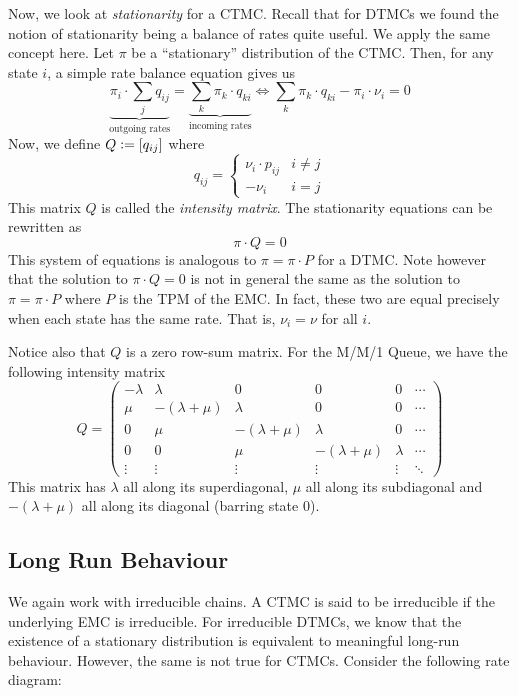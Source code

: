 \documentclass[12pt]{article}
\theoremstyle{definition}
\begin{document}
Now, we look at \emph{stationarity} for a CTMC. Recall that for DTMCs we found the notion of stationarity being a balance of rates quite useful. We apply the same concept here. Let $\pi$ be a ``stationary'' distribution of the CTMC. Then, for any state $i$, a simple rate balance equation gives us
\[
    \underbrace{ \pi_i \cdot \sum_{j} q_{ij} }_{\text{outgoing rates}} = \underbrace{\sum_k \pi_k \cdot q_{ki}}_{\text{incoming rates}} \iff \sum_k \pi_k \cdot q_{ki} - \pi_i \cdot \nu_i = 0
\]
Now, we define $Q \vcentcolon= [q_{ij}]$ where
\[
    q_{ij} = 
    \begin{cases}
        \nu_i \cdot p_{ij} & i \neq j \\
        -\nu_i & i=j
    \end{cases}
\]
This matrix $Q$ is called the \emph{intensity matrix}. The stationarity equations can be rewritten as
\[
    \pi \cdot Q = 0
\]
This system of equations is analogous to $\pi = \pi \cdot P$ for a DTMC. Note however that the solution to $\pi \cdot Q = 0$ is not in general the same as the solution to $\pi = \pi \cdot P$ where $P$ is the TPM of the EMC. In fact, these two are equal precisely when each state has the same rate. That is, $\nu_i = \nu$ for all $i$. 

\medskip

Notice also that $Q$ is a zero row-sum matrix. For the M/M/1 Queue, we have the following intensity matrix
\[
    Q = 
    \begin{pmatrix}
        -\lambda & \lambda & 0 & 0 & 0 & \cdots \\
        \mu & -(\lambda + \mu) & \lambda & 0 & 0 & \cdots \\
        0 & \mu & -(\lambda + \mu) & \lambda & 0 & \cdots \\
        0 & 0 & \mu & -(\lambda + \mu) & \lambda  & \cdots \\
        \vdots & \vdots & \vdots & \vdots & \vdots & \ddots
    \end{pmatrix}
\]
This matrix has $\lambda$ all along its superdiagonal, $\mu$ all along its subdiagonal and $-(\lambda + \mu)$ all along its diagonal (barring state $0$).

\subsection{Long Run Behaviour}

We again work with irreducible chains. A CTMC is said to be irreducible if the underlying EMC is irreducible. For irreducible DTMCs, we know that the existence of a stationary distribution is equivalent to meaningful long-run behaviour. However, the same is not true for CTMCs. Consider the following rate diagram:
\end{document}
